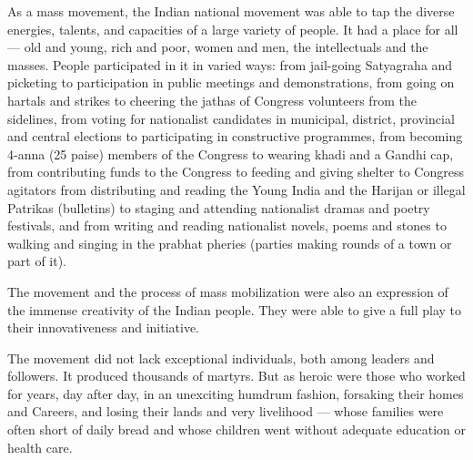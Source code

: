 As a mass movement, the Indian national movement was able to tap the diverse energies, talents, and capacities of a large variety of people. It had a place for all — old and young, rich and poor, women and men, the intellectuals and the masses. People participated in it in varied ways: from jail-going Satyagraha and picketing to participation in public meetings and demonstrations, from going on hartals and strikes to cheering the jathas of Congress volunteers from the sidelines, from voting for nationalist candidates in municipal, district, provincial and central elections to participating in constructive programmes, from becoming 4-anna (25 paise) members of the Congress to wearing khadi and a Gandhi cap, from contributing funds to the Congress to feeding and giving shelter to Congress agitators from distributing and reading the Young India and the Harijan or illegal Patrikas (bulletins) to staging and attending nationalist dramas and poetry festivals, and from writing and reading nationalist novels, poems and stones to walking and singing in the prabhat pheries (parties making rounds of a town or part of it).

The movement and the process of mass mobilization were also an expression of the immense creativity of the Indian people. They were able to give a full play to their innovativeness and initiative.

The movement did not lack exceptional individuals, both among leaders and followers. It produced thousands of martyrs. But as heroic were those who worked for years, day after day, in an unexciting humdrum fashion, forsaking their homes and Careers, and losing their lands and very livelihood — whose families were often short of daily bread and whose children went without adequate education or health care.

